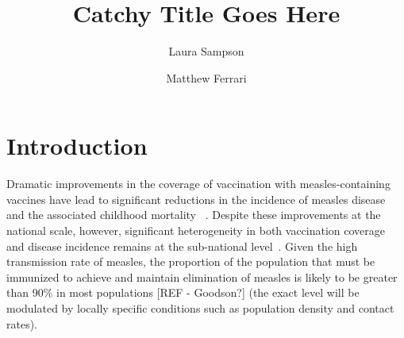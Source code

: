 \documentclass[nofootinbib,aps,pre,twocolumn,superscriptaddress,showkeys,showpacs]{revtex4-1}
\begin{document}
\title{Catchy Title Goes Here}
\author{Laura Sampson}
\author{Matthew Ferrari}

\begin{abstract}


\end{abstract}
\maketitle

\section{Introduction \label{sec:Intro}}
Dramatic improvements in the coverage of vaccination with measles-containing vaccines have lead to significant reductions in the incidence of measles disease and the associated childhood mortality ~\cite{perry_global_2014}. Despite these improvements at the national scale, however, significant heterogeneity in both vaccination coverage and disease incidence remains at the sub-national level~\cite{prada_demographics_2017,takahashi_geography_2017,metcalf_transport_2015}.
Given the high transmission rate of measles, the proportion of the population that must be immunized to achieve and maintain elimination of measles is likely to be greater than 90\% in most populations [REF - Goodson?] (the exact level will be modulated by locally specific conditions such as population density and contact rates).
\end{document}
